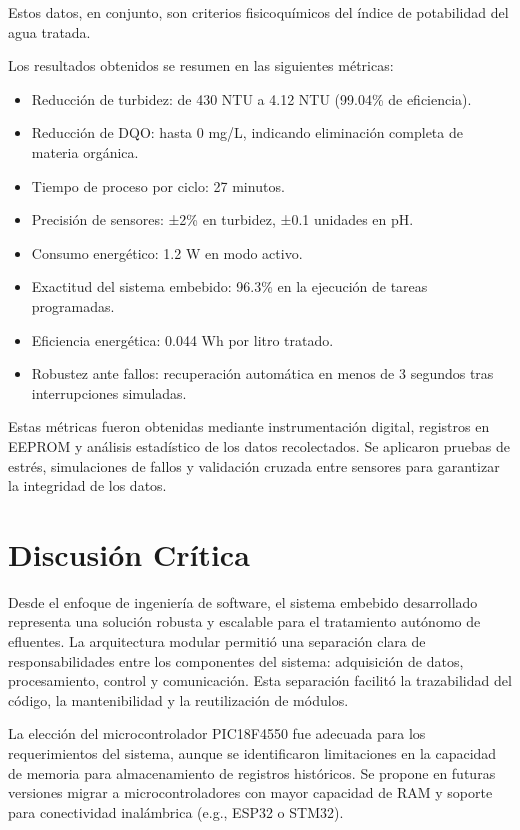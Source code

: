 \documentclass[conference]{IEEEtran}
\begin{document}
Estos datos, en conjunto, son criterios fisicoquímicos del índice de potabilidad del agua tratada.

Los resultados obtenidos se resumen en las siguientes métricas:

\begin{itemize}
	\item Reducción de turbidez: de 430 NTU a 4.12 NTU (99.04\% de eficiencia).
	\item Reducción de DQO: hasta 0 mg/L, indicando eliminación completa de materia orgánica.
	\item Tiempo de proceso por ciclo: 27 minutos.
	\item Precisión de sensores: ±2\% en turbidez, ±0.1 unidades en pH.
	\item Consumo energético: 1.2 W en modo activo.
	\item Exactitud del sistema embebido: 96.3\% en la ejecución de tareas programadas.
	\item Eficiencia energética: 0.044 Wh por litro tratado.
	\item Robustez ante fallos: recuperación automática en menos de 3 segundos tras interrupciones simuladas.
\end{itemize}

	Estas métricas fueron obtenidas mediante instrumentación digital, registros en EEPROM y análisis estadístico de los datos recolectados. Se aplicaron pruebas de estrés, simulaciones de fallos y validación cruzada entre sensores para garantizar la integridad de los datos.
	
	\section{Discusión Crítica}
	
	Desde el enfoque de ingeniería de software, el sistema embebido desarrollado representa una solución robusta y escalable para el tratamiento autónomo de efluentes. La arquitectura modular permitió una separación clara de responsabilidades entre los componentes del sistema: adquisición de datos, procesamiento, control y comunicación. Esta separación facilitó la trazabilidad del código, la mantenibilidad y la reutilización de módulos.
	
	La elección del microcontrolador PIC18F4550 fue adecuada para los requerimientos del sistema, aunque se identificaron limitaciones en la capacidad de memoria para almacenamiento de registros históricos. Se propone en futuras versiones migrar a microcontroladores con mayor capacidad de RAM y soporte para conectividad inalámbrica (e.g., ESP32 o STM32).
	
\end{document}
